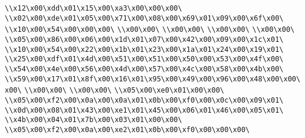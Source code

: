 \verb|\\x12\x00\xdd\x01\x15\x00\xa3\x00\x00\x00\|\newline
\verb|\\x02\x00\xde\x01\x05\x00\x71\x00\x08\x00\x69\x01\x09\x00\x6f\x00\|\newline
\verb|\\x10\x00\x54\x00\x00\x00\|\newline
\verb|\\x00\x00\|\newline
\verb|\\x00\x00\|\newline
\verb|\\x00\x00\|\newline
\verb|\\x00\x00\|\newline
\verb|\\x05\x00\x86\x00\x06\x00\x1d\x01\x07\x00\x42\x00\x09\x00\x1c\x01\|\newline
\verb|\\x10\x00\x54\x00\x22\x00\x1b\x01\x23\x00\x1a\x01\x24\x00\x19\x01\|\newline
\verb|\\x25\x00\xdf\x01\x4d\x00\x51\x00\x51\x00\x50\x00\x53\x00\x4f\x00\|\newline
\verb|\\x54\x00\x4e\x00\x56\x00\x4d\x00\x57\x00\x4c\x00\x58\x00\x4b\x00\|\newline
\verb|\\x59\x00\x17\x01\x8f\x00\x16\x01\x95\x00\x49\x00\x96\x00\x48\x00\x00\x00\|\newline
\verb|\\x00\x00\|\newline
\verb|\\x00\x00\|\newline
\verb|\\x05\x00\xe0\x01\x00\x00\|\newline
\verb|\\x05\x00\xf2\x00\x0a\x00\x0a\x01\x0b\x00\xf0\x00\x0c\x00\x09\x01\|\newline
\verb|\\x0d\x00\x08\x01\x43\x00\xe1\x01\x45\x00\x06\x01\x46\x00\x05\x01\|\newline
\verb|\\x4b\x00\x04\x01\x7b\x00\x03\x01\x00\x00\|\newline
\verb|\\x05\x00\xf2\x00\x0a\x00\xe2\x01\x0b\x00\xf0\x00\x00\x00\|\newline
